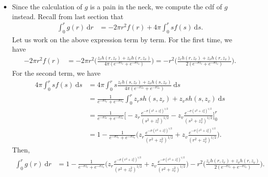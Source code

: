 \documentclass[10pt]{article}
\newcommand{\dee}{\mathrm{d}}
\begin{document}
\begin{itemize}
	\item Since the calculation of $g$ is a pain in the neck, we compute
		the cdf of $g$ instead. Recall from last section that
		\begin{align*}			
		\int_0^r g(r)\ \dee r 
		&= - 2\pi r^2 f(r) + 4\pi \int_0^r sf(s)\ \dee s.		
		\end{align*}
		Let us work on the above expression term by term.
		For the first time, we have
		\begin{align*}
			-2\pi r^2 f(r) 
			&= -2\pi r^2 \bigg( \frac{z_r h(r,z_r) + z_v h(r,z_v)}{4\pi(e^{-\sigma z_r} + e^{-\sigma z_v})} \bigg)
			= -r^2 \bigg( \frac{z_r h(r,z_r) + z_v h(r,z_v)}{2(e^{-\sigma z_r} + e^{-\sigma z_v})} \bigg).
		\end{align*}
		For the second term, we have
		\begin{align*}
			4\pi \int_0^r sf(s)\ \dee s
			&= 4\pi \int_0^r s \frac{z_r h(s,z_r) + z_v h(s,z_v)}{4\pi(e^{-\sigma z_r} + e^{-\sigma z_v})}\ \dee s\\
			&= \frac{1}{e^{-\sigma z_r} + e^{-\sigma z_v}}
			\int_0^r z_r s h(s,z_r) + z_v s h(s,z_v)\ \dee s\\
			&= \frac{1}{e^{-\sigma z_r} + e^{-\sigma z_v}}
			\bigg[ -z_r \frac{
				e^{-\sigma (s^2+z_r^2)^{1/2}}}
				{(s^2 + z_r^2)^{1/2}} 
				- z_v \frac{
				e^{-\sigma (s^2+z_v^2)^{1/2}}}
				{(s^2 + z_v^2)^{1/2}} \bigg]_0^r\\
			&= 1  - \frac{1}{e^{-\sigma z_r} + e^{-\sigma z_v}}
			 \bigg( z_r \frac{
				e^{-\sigma (r^2+z_r^2)^{1/2}}}
				{(r^2 + z_r^2)^{1/2}} 
				+ z_v \frac{
				e^{-\sigma (r^2+z_v^2)^{1/2}}}
				{(r^2 + z_v^2)^{1/2}} \bigg).
		\end{align*}
		Then,
		\begin{align*}
			\int_0^r g(r)\ \dee r 
			&= 1 - \frac{1}{e^{-\sigma z_r} + e^{-\sigma z_v}}
			 \bigg( z_r \frac{
				e^{-\sigma (r^2+z_r^2)^{1/2}}}
				{(r^2 + z_r^2)^{1/2}} 
				+ z_v \frac{
				e^{-\sigma (r^2+z_v^2)^{1/2}}}
				{(r^2 + z_v^2)^{1/2}} \bigg)
				 -r^2 \bigg( \frac{z_r h(r,z_r) + z_v h(r,z_v)}{2(e^{-\sigma z_r} + e^{-\sigma z_v})} \bigg).
		\end{align*}
\end{itemize}

\pagebreak
\end{document}
